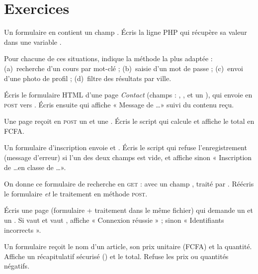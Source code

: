 \section{Exercices}


Un formulaire en  contient un champ .
Écris la ligne PHP qui récupère sa valeur dans une variable .

Pour chacune de ces situations, indique la méthode la plus adaptée :
(a)~recherche d'un cours par mot-clé ; (b)~saisie d'un mot de passe ;
(c)~envoi d'une photo de profil ; (d)~filtre des résultats par ville.

Écris le formulaire HTML d'une page \emph{Contact} (champs : ,
, et un ), qui envoie en \textsc{post}
vers . Écris ensuite  qui affiche
« Message de \dots » suivi du contenu reçu.

Une page reçoit en \textsc{post} un  et une . Écris le
script qui calcule et affiche le total en FCFA.

Un formulaire d'inscription envoie  et . Écris le script
qui refuse l'enregistrement (message d'erreur) si l'un des deux champs est vide,
et affiche sinon « Inscription de \dots en classe de \dots ».


On donne ce formulaire de recherche en \textsc{get} :
 avec un champ
, traité par . Réécris le
formulaire \emph{et} le traitement en méthode \textsc{post}.

Écris une page  (formulaire + traitement dans le même fichier)
qui demande un  et un . Si  vaut
 et  vaut , affiche « Connexion
réussie » ; sinon « Identifiants incorrects ».

Un formulaire reçoit le nom d'un article, son prix unitaire (FCFA) et la quantité.
Affiche un récapitulatif sécurisé () et le total. Refuse les
prix ou quantités négatifs.

